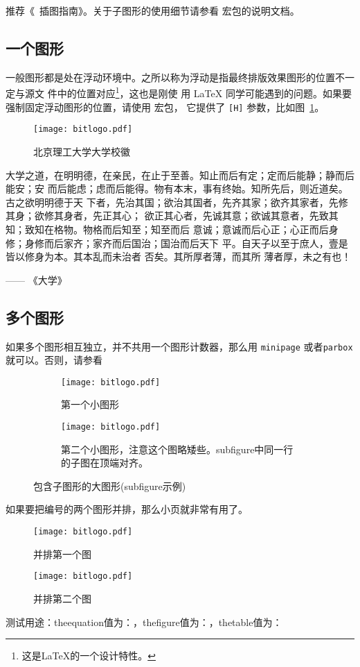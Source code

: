 推荐《\LaTeXe\ 插图指南》。关于子图形的使用细节请参看  宏包的说明文档。

\subsection{一个图形}
\label{sec:onefig}
一般图形都是处在浮动环境中。之所以称为浮动是指最终排版效果图形的位置不一定与源文
件中的位置对应\footnote{这是\LaTeX 的一个设计特性。}，这也是刚使
用 \LaTeX{} 同学可能遇到的问题。如果要强制固定浮动图形的位置，请使用  宏包，
它提供了 \texttt{[H]} 参数，比如图~\ref{fig:xfig1}。
\begin{figure}[htb] %
	\centering
	\texttt{[image: bitlogo.pdf]}
	\caption{北京理工大学大学校徽}
	\label{fig:xfig1}
\end{figure}

大学之道，在明明德，在亲民，在止于至善。知止而后有定；定而后能静；静而后能安；安
而后能虑；虑而后能得。物有本末，事有终始。知所先后，则近道矣。古之欲明明德于天
下者，先治其国；欲治其国者，先齐其家；欲齐其家者，先修其身；欲修其身者，先正其心；
欲正其心者，先诚其意；欲诚其意者，先致其知；致知在格物。物格而后知至；知至而后
意诚；意诚而后心正；心正而后身 修；身修而后家齐；家齐而后国治；国治而后天下
平。自天子以至于庶人，壹是皆以修身为本。其本乱而未治者 否矣。其所厚者薄，而其所
薄者厚，未之有也！

\hfill —— 《大学》


\subsection{多个图形}
\label{sec:multifig}

如果多个图形相互独立，并不共用一个图形计数器，那么用 \texttt{minipage} 或者\texttt{parbox} 就可以。否则，请参看
\begin{figure}[ht]
	\centering%
	\begin{subfigure}{3cm}
		\texttt{[image: bitlogo.pdf]}
		\caption{第一个小图形}
	\end{subfigure}%
	\hspace{4em}%
	\begin{subfigure}{3cm}
		\texttt{[image: bitlogo.pdf]}
		\caption{第二个小图形，注意这个图略矮些。subfigure中同一行的子图在顶端对齐。}
	\end{subfigure}
	\caption{包含子图形的大图形(subfigure示例)}
	\label{fig:big1-subfigure}
\end{figure}

如果要把编号的两个图形并排，那么小页就非常有用了。
\begin{figure}
	\begin{minipage}{0.48\textwidth}
		\centering
		\texttt{[image: bitlogo.pdf]}
		\caption{并排第一个图}
		\label{fig:parallel1}
	\end{minipage}\hfill
	\begin{minipage}{0.48\textwidth}
		\centering
		\texttt{[image: bitlogo.pdf]}
		\caption{并排第二个图}
		\label{fig:parallel2}
	\end{minipage}
\end{figure}

测试用途：theequation值为：\theequation ，thefigure值为：\thefigure ，thetable值为：\thetable
